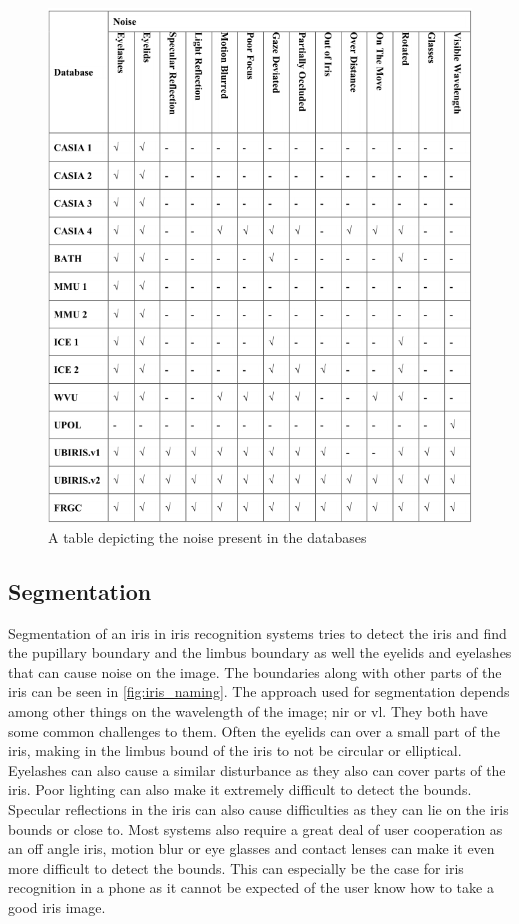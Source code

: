 \begin{figure}[h]
\centering
\includegraphics[width=\textwidth]{figures/Iris_Database_tabel_2.png} 
\caption{A table depicting the noise present in the databases}
\label{fig:Iris_database_2}
\end{figure}


\subsection{Segmentation}
Segmentation of an iris in iris recognition systems tries to detect the iris and find the pupillary boundary and the limbus boundary as well the eyelids and eyelashes that can cause noise on the image. The boundaries along with other parts of the iris can be seen in \autoref{fig:iris_naming}. The approach used for segmentation depends among other things  on the wavelength of the image; \gls{nir} or \gls{vl}. They both have some common challenges to them. Often the eyelids can over a small part of the iris, making in the limbus bound of the iris to not be circular or elliptical. Eyelashes can also cause a similar disturbance as they also can cover parts of the iris. Poor lighting can also make it extremely difficult to detect the bounds. Specular reflections in the iris can also cause difficulties as they can lie on the iris bounds or close to. Most systems also require a great deal of user cooperation as an off angle iris, motion blur or eye glasses and contact lenses can make it even more difficult to detect the bounds. This can especially be the case for iris recognition in a phone as it cannot be expected of the user know how to take a good iris image. 

